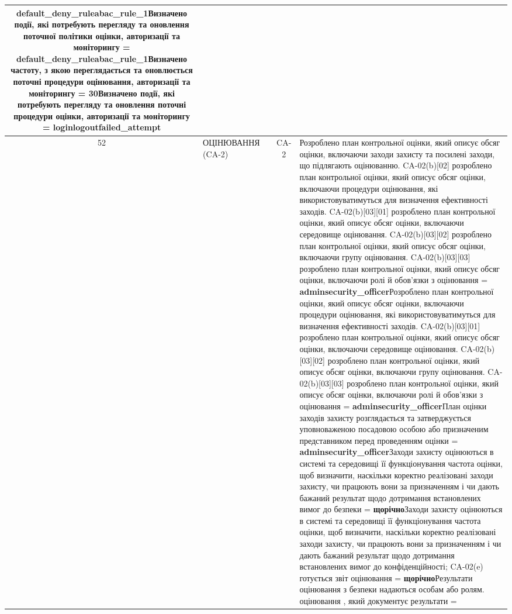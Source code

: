 \documentclass[10pt]{article}
\begin{document}
\begin{longtable}{|c|>{\raggedright\arraybackslash}p{2.5cm}|>{\raggedright\arraybackslash}p{4.5cm}|c|>{\raggedright\arraybackslash}p{4.5cm}|}
\textbf{default\_\allowbreak{}deny\_\allowbreak{}ruleabac\_\allowbreak{}rule\_\allowbreak{}1}\newline Визначено події, які потребують перегляду та оновлення поточної політики оцінки, авторизації та моніторингу = \textbf{default\_\allowbreak{}deny\_\allowbreak{}ruleabac\_\allowbreak{}rule\_\allowbreak{}1}\newline Визначено частоту, з якою переглядається та оновлюється поточні процедури оцінювання, авторизації та моніторингу = \textbf{30}\newline Визначено події, які потребують перегляду та оновлення поточні процедури оцінки, авторизації та моніторингу = \textbf{loginlogoutfailed\_\allowbreak{}attempt} \\ \hline
52 & ОЦІНЮВАННЯ (CA-2) &  & CA-2 & Розроблено план контрольної оцінки, який описує обсяг оцінки, включаючи заходи захисту та посилені заходи, що підлягають оцінюванню. CA-02(b)[02] розроблено план контрольної оцінки, який описує обсяг оцінки, включаючи процедури оцінювання, які використовуватимуться для визначення ефективності заходів. CA-02(b)[03][01] розроблено план контрольної оцінки, який описує обсяг оцінки, включаючи середовище оцінювання. CA-02(b)[03][02] розроблено план контрольної оцінки, який описує обсяг оцінки, включаючи групу оцінювання. CA-02(b)[03][03] розроблено план контрольної оцінки, який описує обсяг оцінки, включаючи ролі й обов'язки з оцінювання = \textbf{adminsecurity\_\allowbreak{}officer}\newline Розроблено план контрольної оцінки, який описує обсяг оцінки, включаючи процедури оцінювання, які використовуватимуться для визначення ефективності заходів. CA-02(b)[03][01] розроблено план контрольної оцінки, який описує обсяг оцінки, включаючи середовище оцінювання. CA-02(b)[03][02] розроблено план контрольної оцінки, який описує обсяг оцінки, включаючи групу оцінювання. CA-02(b)[03][03] розроблено план контрольної оцінки, який описує обсяг оцінки, включаючи ролі й обов'язки з оцінювання = \textbf{adminsecurity\_\allowbreak{}officer}\newline План оцінки заходів захисту розглядається та затверджується уповноваженою посадовою особою або призначеним представником перед проведенням оцінки = \textbf{adminsecurity\_\allowbreak{}officer}\newline Заходи захисту оцінюються в системі та середовищі її функціонування частота оцінки, щоб визначити, наскільки коректно реалізовані заходи захисту, чи працюють вони за призначенням і чи дають бажаний результат щодо дотримання встановлених вимог до безпеки = \textbf{щорічно}\newline Заходи захисту оцінюються в системі та середовищі її функціонування частота оцінки, щоб визначити, наскільки коректно реалізовані заходи захисту, чи працюють вони за призначенням і чи дають бажаний результат щодо дотримання встановлених вимог до конфіденційності; CA-02(e) готується звіт оцінювання = \textbf{щорічно}\newline Результати оцінювання з безпеки надаються особам або ролям. оцінювання , який документує результати = 
\end{longtable}
\end{document}
